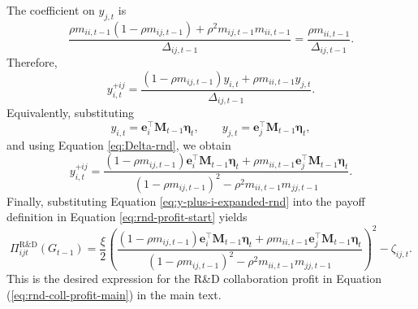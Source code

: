 The coefficient on $y_{j,t}$ is
\[
\frac{
\rho m_{ii,t-1}(1-\rho m_{ij,t-1})
+
\rho^2m_{ij,t-1}m_{ii,t-1}
}{
\Delta_{ij,t-1}
}
=
\frac{
\rho m_{ii,t-1}
}{
\Delta_{ij,t-1}
}.
\]
Therefore,
\begin{equation}
y_{i,t}^{+ij}
=
\frac{
(1-\rho m_{ij,t-1})y_{i,t}
+
\rho m_{ii,t-1}y_{j,t}
}{
\Delta_{ij,t-1}
}.
\label{eq:y-plus-i-rnd}
\end{equation}
Equivalently, substituting
\[
y_{i,t}
=
\mathbf{e}_i^\top\mathbf{M}_{t-1}\bm{\eta}_t,
\qquad
y_{j,t}
=
\mathbf{e}_j^\top\mathbf{M}_{t-1}\bm{\eta}_t,
\]
and using Equation \eqref{eq:Delta-rnd}, we obtain
\begin{equation}
y_{i,t}^{+ij}
=
\frac{
(1-\rho m_{ij,t-1})
\mathbf{e}_i^\top\mathbf{M}_{t-1}\bm{\eta}_t
+
\rho m_{ii,t-1}
\mathbf{e}_j^\top\mathbf{M}_{t-1}\bm{\eta}_t
}{
(1-\rho m_{ij,t-1})^2
-
\rho^2m_{ii,t-1}m_{jj,t-1}
}.
\label{eq:y-plus-i-expanded-rnd}
\end{equation}
Finally, substituting Equation \eqref{eq:y-plus-i-expanded-rnd} into the payoff
definition in Equation \eqref{eq:rnd-profit-start} yields
\begin{equation*}
\Pi_{ijt}^{\text{R\&D}}(G_{t-1})
=
\frac{\xi}{2}
\left(
\frac{
(1-\rho m_{ij,t-1})
\mathbf{e}_i^\top\mathbf{M}_{t-1}\bm{\eta}_t
+
\rho m_{ii,t-1}
\mathbf{e}_j^\top\mathbf{M}_{t-1}\bm{\eta}_t
}{
(1-\rho m_{ij,t-1})^2
-
\rho^2m_{ii,t-1}m_{jj,t-1}
}
\right)^2
-
\zeta_{ij,t}.
\end{equation*}
This is the desired expression for the R\&D collaboration profit in Equation (\ref{eq:rnd-coll-profit-main}) in the main text.

